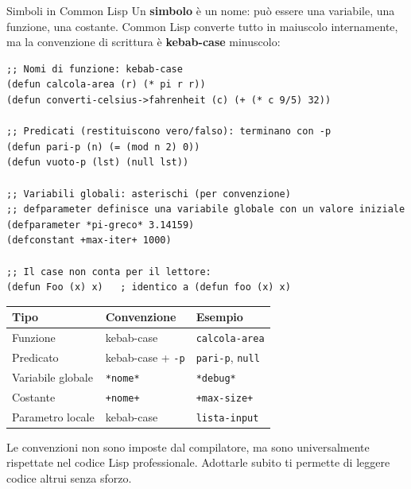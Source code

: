 \begin{concetto}{Simboli in Common Lisp}
Un \textbf{simbolo} è un nome: può essere una variabile, una funzione,
una costante. Common Lisp converte tutto in maiuscolo internamente,
ma la convenzione di scrittura è \textbf{kebab-case} minuscolo:
\end{concetto}

\begin{esempio}
\begin{lstlisting}
;; Nomi di funzione: kebab-case
(defun calcola-area (r) (* pi r r))
(defun converti-celsius->fahrenheit (c) (+ (* c 9/5) 32))

;; Predicati (restituiscono vero/falso): terminano con -p
(defun pari-p (n) (= (mod n 2) 0))
(defun vuoto-p (lst) (null lst))

;; Variabili globali: asterischi (per convenzione)
;; defparameter definisce una variabile globale con un valore iniziale
(defparameter *pi-greco* 3.14159)
(defconstant +max-iter+ 1000)

;; Il case non conta per il lettore:
(defun Foo (x) x)   ; identico a (defun foo (x) x)
\end{lstlisting}
\end{esempio}

\begin{center}
\renewcommand{\arraystretch}{1.5}
\begin{tabular}{@{}lll@{}}
\toprule
\textbf{Tipo} & \textbf{Convenzione} & \textbf{Esempio} \\
\midrule
Funzione       & kebab-case          & \texttt{calcola-area} \\
Predicato      & kebab-case + \texttt{-p} & \texttt{pari-p}, \texttt{null} \\
Variabile globale & \texttt{*nome*}  & \texttt{*debug*} \\
Costante       & \texttt{+nome+}     & \texttt{+max-size+} \\
Parametro locale & kebab-case        & \texttt{lista-input} \\
\bottomrule
\end{tabular}
\end{center}

\begin{nota}
Le convenzioni non sono imposte dal compilatore, ma sono universalmente
rispettate nel codice Lisp professionale. Adottarle subito ti permette
di leggere codice altrui senza sforzo.
\end{nota}

